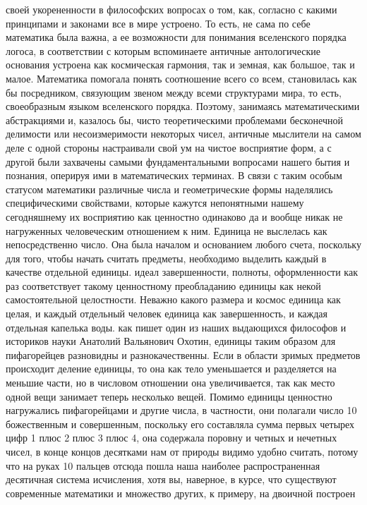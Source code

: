 своей укорененности в философских вопросах о том, как, согласно с какими
принципами и законами все в мире устроено. То есть, не сама по себе математика
была важна, а ее возможности для понимания вселенского порядка логоса, в
соответствии с которым вспоминаете античные антологические основания устроена
как космическая гармония, так и земная, как большое, так и малое. Математика
помогала понять соотношение всего со всем, становилась как бы посредником,
связующим звеном между всеми структурами мира, то есть, своеобразным языком
вселенского порядка. Поэтому, занимаясь математическими абстракциями и, казалось
бы, чисто теоретическими проблемами бесконечной делимости или несоизмеримости
некоторых чисел, античные мыслители на самом деле с одной стороны настраивали
свой ум на чистое восприятие форм, а с другой были захвачены самыми
фундаментальными вопросами нашего бытия и познания, оперируя ими в
математических терминах. В связи с таким особым статусом математики различные
числа и геометрические формы наделялись специфическими свойствами, которые
кажутся непонятными нашему сегодняшнему их восприятию как ценностно одинаково да
и вообще никак не нагруженных человеческим отношением к ним. Единица не
выслелась как непосредственно число. Она была началом и основанием любого счета,
поскольку для того, чтобы начать считать предметы, необходимо выделить каждый в
качестве отдельной единицы. идеал завершенности, полноты, оформленности как раз
соответствует такому ценностному преобладанию единицы как некой самостоятельной
целостности. Неважно какого размера и космос единица как целая, и каждый
отдельный человек единица как завершенность, и каждая отдельная капелька воды.
как пишет один из наших выдающихся философов и историков науки Анатолий
Вальянович Охотин, единицы таким образом для пифагорейцев разновидны и
разнокачественны. Если в области зримых предметов происходит деление единицы, то
она как тело уменьшается и разделяется на меньшие части, но в числовом отношении
она увеличивается, так как место одной вещи занимает теперь несколько вещей.
Помимо единицы ценностно нагружались пифагорейцами и другие числа, в частности,
они полагали число 10 божественным и совершенным, поскольку его составляла сумма
первых четырех цифр 1 плюс 2 плюс 3 плюс 4, она содержала поровну и четных и
нечетных чисел, в конце концов десятками нам от природы видимо удобно считать,
потому что на руках 10 пальцев отсюда пошла наша наиболее распространенная
десятичная система исчисления, хотя вы, наверное, в курсе, что существуют
современные математики и множество других, к примеру, на двоичной построен
